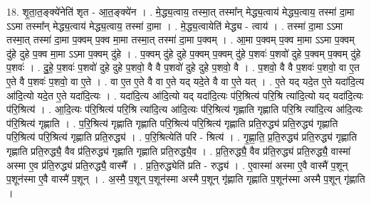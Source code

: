 \documentclass[17pt]{extarticle}
\begin{document}
18. शृ॒ता॒त॒ङ्क्ये॑नेति॑ शृत - आ॒त॒ङ्क्ये॑न । . मे॒द्ध्य॒त्वाय॒ तस्मा॒त् तस्मा᳚न् मेद्ध्य॒त्वाय॑ मेद्ध्य॒त्वाय॒ तस्मा॑ दा॒मा ऽऽमा तस्मा᳚न् मेद्ध्य॒त्वाय॑ मेद्ध्य॒त्वाय॒ तस्मा॑ दा॒मा । . मे॒द्ध्य॒त्वायेति॑ मेद्ध्य - त्वाय॑ । . तस्मा॑ दा॒मा ऽऽमा तस्मा॒त् तस्मा॑ दा॒मा प॒क्वम् प॒क्व मा॒मा तस्मा॒त् तस्मा॑ दा॒मा प॒क्वम् । . आ॒मा प॒क्वम् प॒क्व मा॒मा ऽऽमा प॒क्वम् दु॑हे दुहे प॒क्व मा॒मा ऽऽमा प॒क्वम् दु॑हे । . प॒क्वम् दु॑हे दुहे प॒क्वम् प॒क्वम् दु॑हे प॒शवः॑ प॒शवो॑ दुहे प॒क्वम् प॒क्वम् दु॑हे प॒शवः॑ । . दु॒हे॒ प॒शवः॑ प॒शवो॑ दुहे दुहे प॒शवो॒ वै वै प॒शवो॑ दुहे दुहे प॒शवो॒ वै । . प॒शवो॒ वै वै प॒शवः॑ प॒शवो॒ वा ए॒त ए॒ते वै प॒शवः॑ प॒शवो॒ वा ए॒ते । . वा ए॒त ए॒ते वै वा ए॒ते यद् यदे॒ते वै वा ए॒ते यत् । . ए॒ते यद् यदे॒त ए॒ते यदा॑दि॒त्य आ॑दि॒त्यो यदे॒त ए॒ते यदा॑दि॒त्यः । . यदा॑दि॒त्य आ॑दि॒त्यो यद् यदा॑दि॒त्यः प॑रि॒श्रित्य॑ परि॒श्रि त्या॑दि॒त्यो यद् यदा॑दि॒त्यः प॑रि॒श्रित्य॑ । . आ॒दि॒त्यः प॑रि॒श्रित्य॑ परि॒श्रि त्या॑दि॒त्य आ॑दि॒त्यः प॑रि॒श्रित्य॑ गृह्णाति गृह्णाति परि॒श्रि त्या॑दि॒त्य आ॑दि॒त्यः प॑रि॒श्रित्य॑ गृह्णाति । . प॒रि॒श्रित्य॑ गृह्णाति गृह्णाति परि॒श्रित्य॑ परि॒श्रित्य॑ गृह्णाति प्रति॒रुद्ध्य॑ प्रति॒रुद्ध्य॑ गृह्णाति परि॒श्रित्य॑ परि॒श्रित्य॑ गृह्णाति प्रति॒रुद्ध्य॑ । . प॒रि॒श्रित्येति॑ परि - श्रित्य॑ । . गृ॒ह्णा॒ति॒ प्र॒ति॒रुद्ध्य॑ प्रति॒रुद्ध्य॑ गृह्णाति गृह्णाति प्रति॒रुद्ध्यै॒ वैव प्र॑ति॒रुद्ध्य॑ गृह्णाति गृह्णाति प्रति॒रुद्ध्यै॒व । . प्र॒ति॒रुद्ध्यै॒ वैव प्र॑ति॒रुद्ध्य॑ प्रति॒रुद्ध्यै॒ वास्मा॑ अस्मा ए॒व प्र॑ति॒रुद्ध्य॑ प्रति॒रुद्ध्यै॒ वास्मै᳚ । . प्र॒ति॒रुद्ध्येति॑ प्रति - रुद्ध्य॑ । . ए॒वास्मा॑ अस्मा ए॒वै वास्मै॑ प॒शून् प॒शून॑स्मा ए॒वै वास्मै॑ प॒शून् । . अ॒स्मै॒ प॒शून् प॒शून॑स्मा अस्मै प॒शून् गृ॑ह्णाति गृह्णाति प॒शून॑स्मा अस्मै प॒शून् गृ॑ह्णाति । \newline
\end{document}
